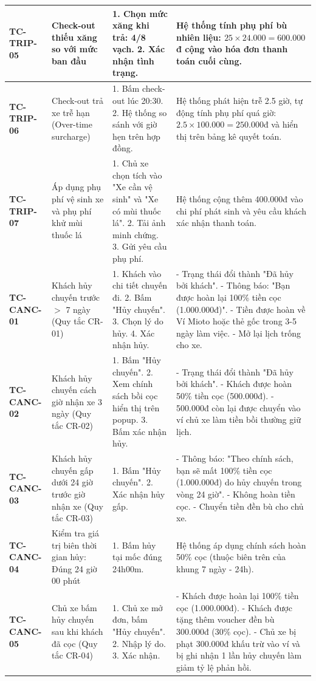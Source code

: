 {\begin{longtable}{p{2.3cm}p{3.8cm}p{4.8cm}p{4.2cm}}
\textbf{TC-TRIP-05} & Check-out thiếu xăng so với mức ban đầu & 1. Chọn mức xăng khi trả: 4/8 vạch. 2. Xác nhận tình trạng. & Hệ thống tính phụ phí bù nhiên liệu: $25 \times 24.000 = 600.000$đ cộng vào hóa đơn thanh toán cuối cùng. \\ \midrule
\textbf{TC-TRIP-06} & Check-out trả xe trễ hạn (Over-time surcharge) & 1. Bấm check-out lúc 20:30. 2. Hệ thống so sánh với giờ hẹn trên hợp đồng. & Hệ thống phát hiện trễ 2.5 giờ, tự động tính phụ phí quá giờ: $2.5 \times 100.000 = 250.000$đ và hiển thị trên bảng kê quyết toán. \\ \midrule
\textbf{TC-TRIP-07} & Áp dụng phụ phí vệ sinh xe và phụ phí khử mùi thuốc lá & 1. Chủ xe chọn tích vào "Xe cần vệ sinh" và "Xe có mùi thuốc lá". 2. Tải ảnh minh chứng. 3. Gửi yêu cầu phụ phí. & Hệ thống cộng thêm 400.000đ vào chi phí phát sinh và yêu cầu khách xác nhận thanh toán. \\ \midrule
\textbf{TC-CANC-01} & Khách hủy chuyến trước $>$ 7 ngày (Quy tắc CR-01) & 1. Khách vào chi tiết chuyến đi. 2. Bấm "Hủy chuyến". 3. Chọn lý do hủy. 4. Xác nhận hủy. & - Trạng thái đổi thành "Đã hủy bởi khách". - Thông báo: "Bạn được hoàn lại 100\% tiền cọc (1.000.000đ)". - Tiền được hoàn về Ví Mioto hoặc thẻ gốc trong 3-5 ngày làm việc. - Mở lại lịch trống cho xe. \\ \midrule
\textbf{TC-CANC-02} & Khách hủy chuyến cách giờ nhận xe 3 ngày (Quy tắc CR-02) & 1. Bấm "Hủy chuyến". 2. Xem chính sách bồi cọc hiển thị trên popup. 3. Bấm xác nhận hủy. & - Trạng thái đổi thành "Đã hủy bởi khách". - Khách được hoàn 50\% tiền cọc (500.000đ). - 500.000đ còn lại được chuyển vào ví chủ xe làm tiền bồi thường giữ lịch. \\ \midrule
\textbf{TC-CANC-03} & Khách hủy chuyến gấp dưới 24 giờ trước giờ nhận xe (Quy tắc CR-03) & 1. Bấm "Hủy chuyến". 2. Xác nhận hủy gấp. & - Thông báo: "Theo chính sách, bạn sẽ mất 100\% tiền cọc (1.000.000đ) do hủy chuyến trong vòng 24 giờ". - Không hoàn tiền cọc. - Chuyển tiền đền bù cho chủ xe. \\ \midrule
\textbf{TC-CANC-04} & Kiểm tra giá trị biên thời gian hủy: Đúng 24 giờ 00 phút & 1. Bấm hủy tại mốc đúng 24h00m. & Hệ thống áp dụng chính sách hoàn 50\% cọc (thuộc biên trên của khung 7 ngày - 24h). \\ \midrule
\textbf{TC-CANC-05} & Chủ xe bấm hủy chuyến sau khi khách đã cọc (Quy tắc CR-04) & 1. Chủ xe mở đơn, bấm "Hủy chuyến". 2. Nhập lý do. 3. Xác nhận. & - Khách được hoàn lại 100\% tiền cọc (1.000.000đ). - Khách được tặng thêm voucher đền bù 300.000đ (30\% cọc). - Chủ xe bị phạt 300.000đ khấu trừ vào ví và bị ghi nhận 1 lần hủy chuyến làm giảm tỷ lệ phản hồi. \\ \midrule

\end{longtable}}
